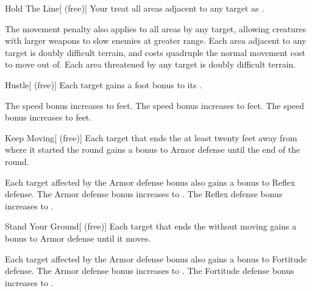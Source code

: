 {            \begin{freeability}{Hold The Line}[ (free)]
                Your  treat all areas adjacent to any target as .

                \rankline
                 The movement penalty also applies to all areas  by any target, allowing creatures with larger weapons to slow enemies at greater range.
                 Each area adjacent to any target is doubly difficult terrain, and costs quadruple the normal movement cost to move out of.
                 Each area threatened by any target is doubly difficult terrain.
            \end{freeability}

            \begin{freeability}{Hustle}[ (free)]
                Each target gains a  foot bonus to its .

                \rankline
                 The speed bonus increases to  feet.
                 The speed bonus increases to  feet.
                 The speed bonus increases to  feet.
            \end{freeability}

            \begin{freeability}{Keep Moving}[ (free)]
                Each target that ends the  at least twenty feet away from where it started the round
                    gains a  bonus to Armor defense until the end of the round.

                \rankline
                 Each target affected by the Armor defense bonus also gains a  bonus to Reflex defense.
                 The Armor defense bonus increases to .
                 The Reflex defense bonus increases to .
            \end{freeability}

            \begin{freeability}{Stand Your Ground}[ (free)]
                Each target that ends the  without moving gains a  bonus to Armor defense until it moves.

                \rankline
                 Each target affected by the Armor defense bonus also gains a  bonus to Fortitude defense.
                 The Armor defense bonus increases to .
                 The Fortitude defense bonus increases to .
            \end{freeability}
        }

